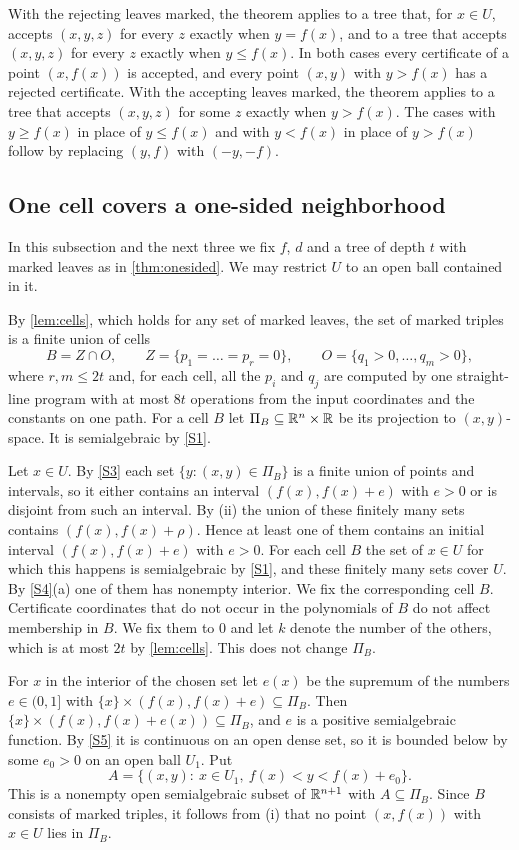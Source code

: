 With the rejecting leaves marked, the theorem applies to a tree that, for $x\in U$, accepts $(x,y,z)$ for every $z$ exactly when $y=f(x)$, and to a tree that accepts $(x,y,z)$ for every $z$ exactly when $y\le f(x)$. In both cases every certificate of a point $(x,f(x))$ is accepted, and every point $(x,y)$ with $y>f(x)$ has a rejected certificate. With the accepting leaves marked, the theorem applies to a tree that accepts $(x,y,z)$ for some $z$ exactly when $y>f(x)$. The cases with $y\ge f(x)$ in place of $y\le f(x)$ and with $y<f(x)$ in place of $y>f(x)$ follow by replacing $(y,f)$ with $(-y,-f)$.

\subsection{One cell covers a one-sided neighborhood}\label{sec:universal-cell}

In this subsection and the next three we fix $f$, $d$ and a tree of depth $t$ with marked leaves as in \cref{thm:onesided}. We may restrict $U$ to an open ball contained in it.

By \cref{lem:cells}, which holds for any set of marked leaves, the set of marked triples is a finite union of cells
\[
B=Z\cap O,\qquad Z=\{p_1=\dots=p_r=0\},\qquad O=\{q_1>0,\dots,q_m>0\},
\]
where $r,m\le2t$ and, for each cell, all the $p_i$ and $q_j$ are computed by one straight-line program with at most $8t$ operations from the input coordinates and the constants on one path. For a cell $B$ let $\Pi_B\subseteq\mathbb{R}^n\times\mathbb{R}$ be its projection to $(x,y)$-space. It is semialgebraic by \ref{S1}.

Let $x\in U$. By \ref{S3} each set $\{y:(x,y)\in\Pi_B\}$ is a finite union of points and intervals, so it either contains an interval $(f(x),f(x)+e)$ with $e>0$ or is disjoint from such an interval. By \textup{(ii)} the union of these finitely many sets contains $(f(x),f(x)+\rho)$. Hence at least one of them contains an initial interval $(f(x),f(x)+e)$ with $e>0$. For each cell $B$ the set of $x\in U$ for which this happens is semialgebraic by \ref{S1}, and these finitely many sets cover $U$. By \ref{S4}(a) one of them has nonempty interior. We fix the corresponding cell $B$. Certificate coordinates that do not occur in the polynomials of $B$ do not affect membership in $B$. We fix them to $0$ and let $k$ denote the number of the others, which is at most $2t$ by \cref{lem:cells}. This does not change $\Pi_B$.

For $x$ in the interior of the chosen set let $e(x)$ be the supremum of the numbers $e\in(0,1]$ with $\{x\}\times(f(x),f(x)+e)\subseteq\Pi_B$. Then $\{x\}\times(f(x),f(x)+e(x))\subseteq\Pi_B$, and $e$ is a positive semialgebraic function. By \ref{S5} it is continuous on an open dense set, so it is bounded below by some $e_0>0$ on an open ball $U_1$. Put
\[
A=\{(x,y):\ x\in U_1,\ f(x)<y<f(x)+e_0\}.
\]
This is a nonempty open semialgebraic subset of $\mathbb{R}^{n+1}$ with $A\subseteq\Pi_B$. Since $B$ consists of marked triples, it follows from \textup{(i)} that no point $(x,f(x))$ with $x\in U$ lies in $\Pi_B$.

